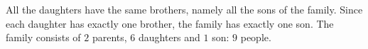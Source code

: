 All the daughters have the same brothers, namely all the sons of the family. Since each daughter has exactly one brother, the family has exactly one son. The family consists of $2$ parents, $6$ daughters and $1$ son: $\boxed{9}$ people.
